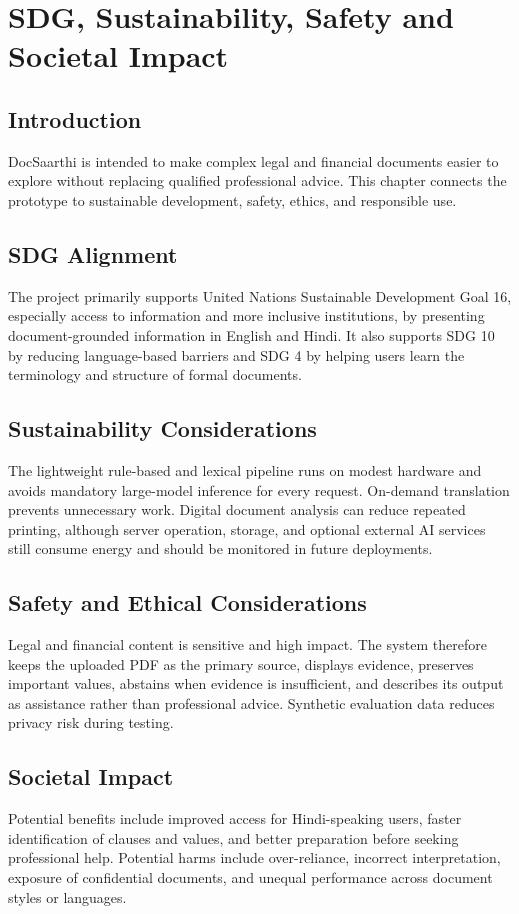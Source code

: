 \chapter{SDG, Sustainability, Safety and Societal Impact}
\label{chap:sdg_impact}

\section{Introduction}
DocSaarthi is intended to make complex legal and financial documents easier to explore without replacing qualified professional advice. This chapter connects the prototype to sustainable development, safety, ethics, and responsible use.

\section{SDG Alignment}
The project primarily supports United Nations Sustainable Development Goal 16, especially access to information and more inclusive institutions, by presenting document-grounded information in English and Hindi. It also supports SDG 10 by reducing language-based barriers and SDG 4 by helping users learn the terminology and structure of formal documents.

\section{Sustainability Considerations}
The lightweight rule-based and lexical pipeline runs on modest hardware and avoids mandatory large-model inference for every request. On-demand translation prevents unnecessary work. Digital document analysis can reduce repeated printing, although server operation, storage, and optional external AI services still consume energy and should be monitored in future deployments.

\section{Safety and Ethical Considerations}
Legal and financial content is sensitive and high impact. The system therefore keeps the uploaded PDF as the primary source, displays evidence, preserves important values, abstains when evidence is insufficient, and describes its output as assistance rather than professional advice. Synthetic evaluation data reduces privacy risk during testing.

\section{Societal Impact}
Potential benefits include improved access for Hindi-speaking users, faster identification of clauses and values, and better preparation before seeking professional help. Potential harms include over-reliance, incorrect interpretation, exposure of confidential documents, and unequal performance across document styles or languages.

